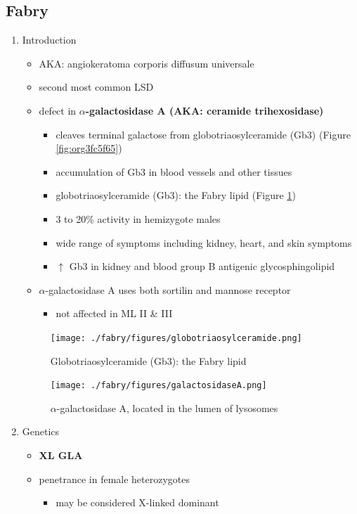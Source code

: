 \documentclass{scrartcl}
\begin{document}
\subsection{Fabry}
\label{sec:orgc245314}
\begin{enumerate}
\item Introduction
\label{sec:org05e902f}
\begin{itemize}
\item AKA: angiokeratoma corporis diffusum universale
\item second most common LSD
\item defect in \textbf{\(\alpha\)-galactosidase A (AKA: ceramide trihexosidase)}
\begin{itemize}
\item cleaves terminal galactose from globotriaosylceramide (Gb3)
(Figure \ref{fig:org3fc5f65})
\item accumulation of Gb3 in blood vessels and other tissues
\item globotriaosylceramide (Gb3): the Fabry lipid (Figure \ref{fig:orgc5f53d7})
\item 3 to 20\% activity in hemizygote males
\item wide range of symptoms including kidney, heart, and skin symptoms
\item \(\uparrow\) Gb3 in kidney and blood group B antigenic glycosphingolipid
\end{itemize}
\item \(\alpha\)-galactosidase A uses both sortilin and mannose receptor
\begin{itemize}
\item not affected in ML II \& III
\end{itemize}
\end{itemize}

\begin{figure}[htbp]
\centering
\texttt{[image: ./fabry/figures/globotriaosylceramide.png]}
\caption[Globotriaosylceramide]{\label{fig:orgc5f53d7}
Globotriaosylceramide (Gb3): the Fabry lipid}
\end{figure}

\begin{figure}[htbp]
\centering
\texttt{[image: ./fabry/figures/galactosidaseA.png]}
\caption[\(\alpha\)-galactosidase A]{\label{fig:org931899c}
\(\alpha\)-galactosidase A, located in the lumen of lysosomes}
\end{figure}

\item Genetics
\label{sec:orga6d4f43}
\begin{itemize}
\item \textbf{XL GLA}
\item penetrance in female heterozygotes
\begin{itemize}
\item may be considered X-linked dominant
\end{itemize}
\end{itemize}


\end{enumerate}
\end{document}
